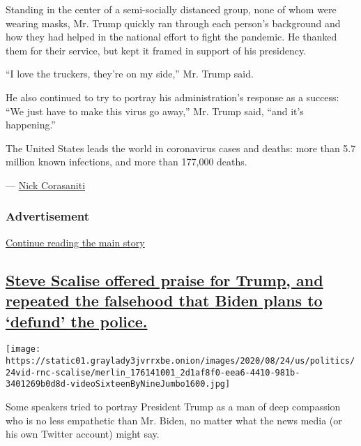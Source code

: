 Standing in the center of a semi-socially distanced group, none of whom
were wearing masks, Mr. Trump quickly ran through each person's
background and how they had helped in the national effort to fight the
pandemic. He thanked them for their service, but kept it framed in
support of his presidency.

``I love the truckers, they're on my side,'' Mr. Trump said.

He also continued to try to portray his administration's response as a
success: ``We just have to make this virus go away,'' Mr. Trump said,
``and it's happening.''

The United States leads the world in coronavirus cases and deaths: more
than 5.7 million known infections, and more than 177,000 deaths.

--- \href{https://www.nytimes3xbfgragh.onion/by/nick-corasaniti}{Nick
Corasaniti}

\hypertarget{advertisement-2}{%
\subsubsection{Advertisement}\label{advertisement-2}}

\protect\hyperlink{after-dfp-ad-mid3}{Continue reading the main story}

\hypertarget{steve-scalise-offered-praise-for-trump-and-repeated-the-falsehood-that-biden-plans-to-defund-the-police}{%
\subsection{\texorpdfstring{\protect\hyperlink{steve-scalise-offered-praise-for-trump-and-repeated-the-falsehood-that-biden-plans-to-defund-the-police}{Steve
Scalise offered praise for Trump, and repeated the falsehood that Biden
plans to `defund' the
police.}}{Steve Scalise offered praise for Trump, and repeated the falsehood that Biden plans to `defund' the police.}}\label{steve-scalise-offered-praise-for-trump-and-repeated-the-falsehood-that-biden-plans-to-defund-the-police}}

\texttt{[image: https://static01.graylady3jvrrxbe.onion/images/2020/08/24/us/politics/24vid-rnc-scalise/merlin\_176141001\_2d1af8f0-eea6-4410-981b-3401269b0d8d-videoSixteenByNineJumbo1600.jpg]}

Some speakers tried to portray President Trump as a man of deep
compassion who is no less empathetic than Mr. Biden, no matter what the
news media (or his own Twitter account) might say.

